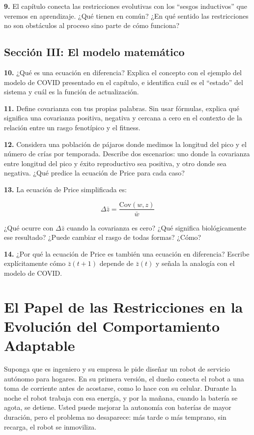 \documentclass[
  letterpaper,
  DIV=11,
  numbers=noendperiod]{scrreprt}
\begin{document}
\textbf{9.} El capítulo conecta las restricciones evolutivas con los
``sesgos inductivos'' que veremos en aprendizaje. ¿Qué tienen en común?
¿En qué sentido las restricciones no son obstáculos al proceso sino
parte de cómo funciona?

\section{Sección III: El modelo
matemático}\label{secciuxf3n-iii-el-modelo-matemuxe1tico}

\textbf{10.} ¿Qué es una ecuación en diferencia? Explica el concepto con
el ejemplo del modelo de COVID presentado en el capítulo, e identifica
cuál es el ``estado'' del sistema y cuál es la función de actualización.

\textbf{11.} Define covarianza con tus propias palabras. Sin usar
fórmulas, explica qué significa una covarianza positiva, negativa y
cercana a cero en el contexto de la relación entre un rasgo fenotípico y
el fitness.

\textbf{12.} Considera una población de pájaros donde medimos la
longitud del pico y el número de crías por temporada. Describe dos
escenarios: uno donde la covarianza entre longitud del pico y éxito
reproductivo sea positiva, y otro donde sea negativa. ¿Qué predice la
ecuación de Price para cada caso?

\textbf{13.} La ecuación de Price simplificada es:

\[\Delta \bar{z} = \frac{\text{Cov}(w, z)}{\bar{w}}\]

¿Qué ocurre con \(\Delta \bar{z}\) cuando la covarianza es cero? ¿Qué
significa biológicamente ese resultado? ¿Puede cambiar el rasgo de todas
formas? ¿Cómo?

\textbf{14.} ¿Por qué la ecuación de Price es también una ecuación en
diferencia? Escribe explícitamente cómo \(\bar{z}(t+1)\) depende de
\(\bar{z}(t)\) y señala la analogía con el modelo de COVID.


\chapter{El Papel de las Restricciones en la Evolución del
Comportamiento
Adaptable}\label{el-papel-de-las-restricciones-en-la-evoluciuxf3n-del-comportamiento-adaptable}

Suponga que es ingeniero y su empresa le pide diseñar un robot de
servicio autónomo para hogares. En su primera versión, el dueño conecta
el robot a una toma de corriente antes de acostarse, como lo hace con su
celular. Durante la noche el robot trabaja con esa energía, y por la
mañana, cuando la batería se agota, se detiene. Usted puede mejorar la
autonomía con baterías de mayor duración, pero el problema no
desaparece: más tarde o más temprano, sin recarga, el robot se
inmoviliza.
\end{document}

